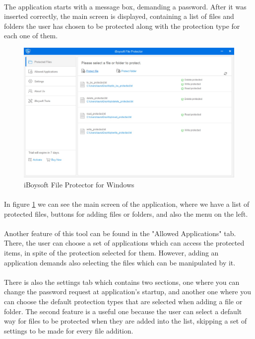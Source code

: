 	\paragraph{}
	The application starts with a message box, demanding a password. After it was inserted correctly, the main screen is displayed, containing a list of files and folders the user has chosen to be protected along with the protection type for each one of them.
	
	\begin{figure}[h!]
		\includegraphics[width=\linewidth]{images/iBoysoftMain.jpg}
		\caption{iBoysoft File Protector for Windows}
		\label{fig:iBoysoftFP}
	\end{figure}
	
	\paragraph{}
	In figure \ref{fig:iBoysoftFP} we can see the main screen of the application, where we have a list of protected files, buttons for adding files or folders, and also the menu on the left. 
	
	\paragraph{}
	Another feature of this tool can be found in the "Allowed Applications" tab. There, the user can choose a set of applications which can access the protected items, in spite of the protection selected for them. However, adding an application demands also selecting the files which can be manipulated by it.
	
	\paragraph{}
	There is also the settings tab which contains two sections, one where you can change the password request at application's startup, and another one where you can choose the default protection types that are selected when adding a file or folder. The second feature is a useful one because the user can select a default way for files to be protected when they are added into the list, skipping a set of settings to be made for every file addition.
	
